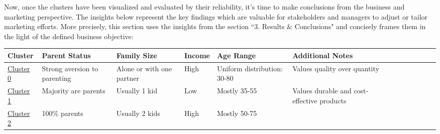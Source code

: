 \documentclass[11pt]{article}
\begin{document}
Now, once the clusters have been visualized and evaluated by their reliability, it’s time to make conclusions from the business and marketing perspective. The insights below represent the key findings which are valuable for stakeholders and managers to adjust or tailor marketing efforts. More precisely, this section uses the insights from the section ``3. Results $\&$ Conclusions" and concisely frames them in the light of the defined business objective:

\begin{table}[H]
\begin{adjustbox}{max width=\textwidth}
\begin{tabular}{p{1.98cm}p{2.17cm}p{2.59cm}p{1.93cm}p{2.51cm}p{2.99cm}p{1.98cm}p{2.17cm}p{2.59cm}p{1.93cm}p{2.51cm}p{2.99cm}}
\hline
\multicolumn{1}{|p{1.98cm}}{\centering
Cluster} & 
\multicolumn{1}{|p{2.17cm}}{\centering
Parent Status} & 
\multicolumn{1}{|p{2.59cm}}{\centering
Family Size} & 
\multicolumn{1}{|p{1.93cm}}{\centering
Income} & 
\multicolumn{1}{|p{2.51cm}}{\centering
Age Range} & 
\multicolumn{1}{|p{2.99cm}|}{\centering
Additional Notes} \\ 
\hline
\multicolumn{1}{|p{1.98cm}}{\centering
\uline{\textcolor[HTML]{BF9000}{Cluster 0}}} & 
\multicolumn{1}{|p{2.17cm}}{\centering
{\footnotesize Strong aversion to parenting}} & 
\multicolumn{1}{|p{2.59cm}}{\centering
{\footnotesize Alone or with one partner}} & 
\multicolumn{1}{|p{1.93cm}}{\centering
{\footnotesize High}} & 
\multicolumn{1}{|p{2.51cm}}{\centering
{\footnotesize Uniform distribution: 30-80}} & 
\multicolumn{1}{|p{2.99cm}|}{\centering
{\footnotesize Values quality over quantity}} \\ 
\hline
\multicolumn{1}{|p{1.98cm}}{\centering
\uline{\textcolor[HTML]{0B5394}{Cluster 1}}} & 
\multicolumn{1}{|p{2.17cm}}{\centering
{\footnotesize Majority are parents}} & 
\multicolumn{1}{|p{2.59cm}}{\centering
{\footnotesize Usually 1 kid}} & 
\multicolumn{1}{|p{1.93cm}}{\centering
{\footnotesize Low}} & 
\multicolumn{1}{|p{2.51cm}}{\centering
{\footnotesize Mostly 35-55}} & 
\multicolumn{1}{|p{2.99cm}|}{\centering
{\footnotesize Values durable and cost-effective products}} \\ 
\hline
\multicolumn{1}{|p{1.98cm}}{\centering
\uline{\textcolor[HTML]{38761D}{Cluster 2}}} & 
\multicolumn{1}{|p{2.17cm}}{\centering
{\footnotesize 100$\%$ parents}} & 
\multicolumn{1}{|p{2.59cm}}{\centering
{\footnotesize Usually 2 kids}} & 
\multicolumn{1}{|p{1.93cm}}{\centering
{\footnotesize High}} & 
\multicolumn{1}{|p{2.51cm}}{\centering
{\footnotesize Mostly 50-75}} & 

\end{tabular}
\end{adjustbox}
\end{table}
\end{document}
